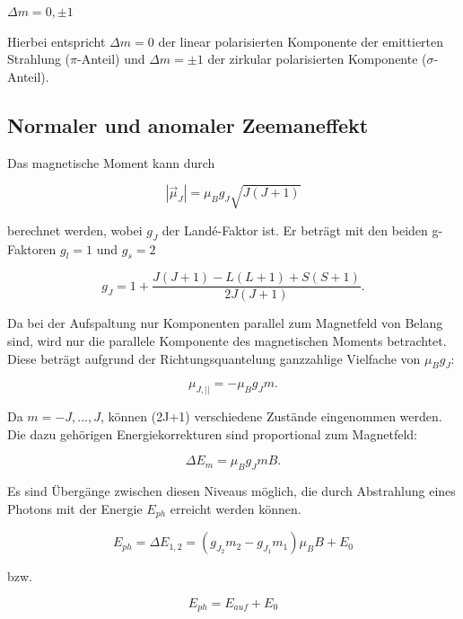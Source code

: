 \begin{center}
	$\Delta m = 0 ,\pm 1$
\end{center}

Hierbei entspricht $\Delta m = 0$ der linear polarisierten Komponente der emittierten Strahlung ($\pi$-Anteil) und $\Delta m = \pm 1$
der zirkular polarisierten Komponente ($\sigma$-Anteil).

\subsection{Normaler und anomaler Zeemaneffekt}

Das magnetische Moment kann durch

\begin{equation}
	|\vec{\mu}_J| = \mu_B g_J \sqrt{J(J+1)}
\end{equation}

berechnet werden, wobei $g_J$ der Landé-Faktor ist. Er beträgt mit den beiden g-Faktoren $g_l=1$ und $g_s=2$

\begin{equation}
	g_J = 1 + \frac{J(J+1) - L(L+1) + S(S+1)}{2J(J+1)} .
\end{equation}

Da bei der Aufspaltung nur Komponenten parallel zum Magnetfeld von Belang sind, wird nur die parallele Komponente des
magnetischen Moments betrachtet. Diese beträgt aufgrund der Richtungsquantelung ganzzahlige Vielfache von $\mu_B g_J$:

\begin{equation}
 \mu_{J,||} = -\mu_B g_J m .
\end{equation}

Da $m = -J, ..., J$, können (2J+1) verschiedene Zustände eingenommen werden. Die dazu gehörigen Energiekorrekturen
sind proportional zum Magnetfeld:

\begin{equation}
 \Delta E_m = \mu_B g_J m B .
 \label{eqn:delta_E}
\end{equation}

Es sind Übergänge zwischen diesen Niveaus möglich, die durch Abstrahlung eines Photons mit der Energie $E_{ph}$
erreicht werden können.

\begin{equation}
	E_{ph} = \Delta E_{1,2} = (g_{J_2} m_2 - g_{J_1} m_1) \mu_B B + E_0
\end{equation}

bzw.

\begin{equation}
	E_{ph} = E_{auf} + E_0
\end{equation}

